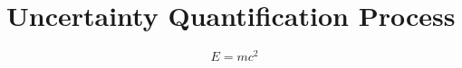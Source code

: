 \chapter[Uncertainty Quantification Process]{Uncertainty Quantification Process}\label{cap_uq_process}

\begin{equation}
E=mc^2
\end{equation}